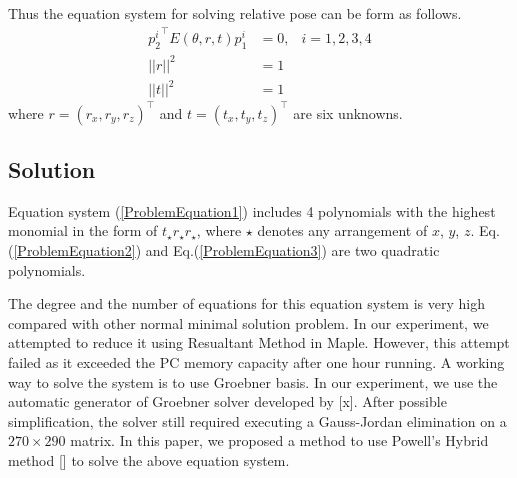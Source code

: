 \documentclass{article}
\begin{document}
Thus the equation system for solving relative pose can be form as follows. 
\begin{eqnarray}
\label{ProblemEquation1}
{p_2^i}^\top E(\theta, r, t) p_1^i & = 0,& i = 1, 2, 3, 4 \\
\label{ProblemEquation2}
|| r ||^2 & = 1 & \\
\label{ProblemEquation3}
|| t ||^2 & = 1 &
\end{eqnarray}
where $r = (r_x, r_y, r_z)^\top$ and $t = (t_x, t_y, t_z)^\top$ are six unknowns. 

\subsection{Solution}
Equation system (\ref{ProblemEquation1}) includes 4 polynomials with the highest monomial in the form of $t_\star r_\star r_\star$, where $\star$ denotes any arrangement of $x$, $y$, $z$. Eq.(\ref{ProblemEquation2}) and Eq.(\ref{ProblemEquation3}) are two quadratic polynomials. 

The degree and the number of equations for this equation system is very high  compared with other normal minimal solution problem. In our experiment, we attempted to reduce it using Resualtant Method in Maple. However, this attempt failed as it exceeded the PC memory capacity after one hour running. A working way to solve the system is to use Groebner basis. In our experiment, we use the automatic generator of Groebner solver developed by [x]. After possible simplification, the solver still required executing a Gauss-Jordan elimination on a $270 \times 290$ matrix. In this paper, we proposed a method to use Powell's Hybrid method [] to solve the above equation system. 
\end{document}
